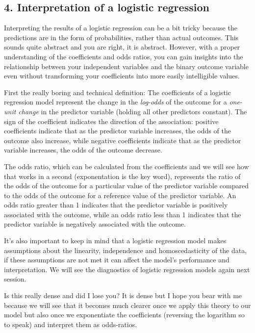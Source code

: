 \documentclass[
  letterpaper,
  DIV=11,
  numbers=noendperiod]{scrreprt}
\begin{document}
\hypertarget{interpretation-of-a-logistic-regression}{%
\subsection{4. Interpretation of a logistic
regression}\label{interpretation-of-a-logistic-regression}}

Interpreting the results of a logistic regression can be a bit tricky
because the predictions are in the form of probabilities, rather than
actual outcomes. This sounds quite abstract and you are right, it is
abstract. However, with a proper understanding of the coefficients and
odds ratios, you can gain insights into the relationship between your
independent variables and the binary outcome variable even without
transforming your coefficients into more easily intelligible values.

First the really boring and technical definition: The coefficients of a
logistic regression model represent the change in the \emph{log-odds} of
the outcome for a \emph{one-unit change} in the predictor variable
(holding all other predictors constant). The sign of the coefficient
indicates the direction of the association: positive coefficients
indicate that as the predictor variable increases, the odds of the
outcome also increase, while negative coefficients indicate that as the
predictor variable increases, the odds of the outcome decrease.

The odds ratio, which can be calculated from the coefficients and we
will see how that works in a second (exponentation is the key word),
represents the ratio of the odds of the outcome for a particular value
of the predictor variable compared to the odds of the outcome for a
reference value of the predictor variable. An odds ratio greater than 1
indicates that the predictor variable is positively associated with the
outcome, while an odds ratio less than 1 indicates that the predictor
variable is negatively associated with the outcome.

It's also important to keep in mind that a logistic regression model
makes assumptions about the linearity, independence and homoscedasticity
of the data, if these assumptions are not met it can affect the model's
performance and interpretation. We will see the diagnostics of logistic
regression models again next session.

Is this really dense and did I lose you? It is dense but I hope you bear
with me because we will see that it becomes much clearer once we apply
this theory to our model but also once we exponentiate the coefficients
(reversing the logarithm so to speak) and interpret them as odds-ratios.
\end{document}
